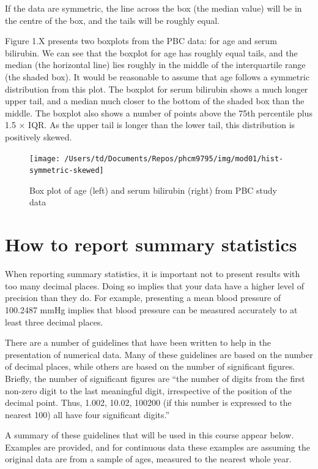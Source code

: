 \documentclass[
]{memoir}
\begin{document}
If the data are symmetric, the line across the box (the median value) will be in the centre of the box, and the tails will be roughly equal.

Figure 1.X presents two boxplots from the PBC data: for age and serum bilirubin. We can see that the boxplot for age has roughly equal tails, and the median (the horizontal line) lies roughly in the middle of the interquartile range (the shaded box). It would be reasonable to assume that age follows a symmetric distribution from this plot. The boxplot for serum bilirubin shows a much longer upper tail, and a median much closer to the bottom of the shaded box than the middle. The boxplot also shows a number of points above the 75th percentile plus 1.5 × IQR. As the upper tail is longer than the lower tail, this distribution is positively skewed.

\begin{figure}
\texttt{[image: /Users/td/Documents/Repos/phcm9795/img/mod01/hist-symmetric-skewed]} \caption{Box plot of age (left) and serum bilirubin (right) from PBC study data}\label{fig:fig-1-7}
\end{figure}

\hypertarget{how-to-report-summary-statistics}{%
\section{How to report summary statistics}\label{how-to-report-summary-statistics}}

When reporting summary statistics, it is important not to present results with too many decimal places. Doing so implies that your data have a higher level of precision than they do. For example, presenting a mean blood pressure of 100.2487 mmHg implies that blood pressure can be measured accurately to at least three decimal places.

There are a number of guidelines that have been written to help in the presentation of numerical data. Many of these guidelines are based on the number of decimal places, while others are based on the number of significant figures. Briefly, the number of significant figures are ``the number of digits from the first non-zero digit to the last meaningful digit, irrespective of the position of the decimal point. Thus, 1.002, 10.02, 100200 (if this number is expressed to the nearest 100) all have four significant digits.'' \citet{armitage_etal13}

A summary of these guidelines that will be used in this course appear below. Examples are provided, and for continuous data these examples are assuming the original data are from a sample of ages, measured to the nearest whole year.
\end{document}
